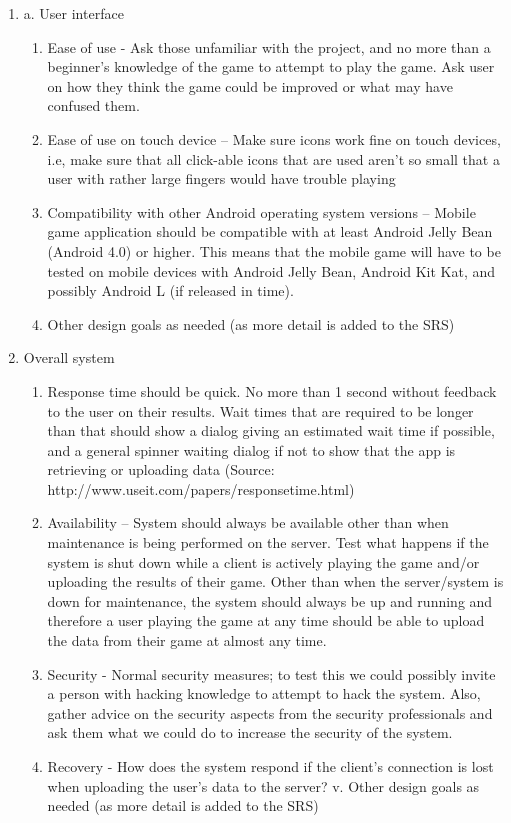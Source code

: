 \documentclass[a4wide]{article}
\begin{document}
\begin{enumerate}
\begin{enumerate}
\item a.	User interface
\begin{enumerate}
\item	Ease of use - Ask those unfamiliar with the project, and no more than a beginner’s knowledge of the game to attempt to play the game. Ask user on how they think the game could be improved or what may have confused them.
\item	Ease of use on touch device – Make sure icons work fine on touch devices, i.e, make sure that all click-able icons that are used aren't so small that a user with rather large fingers would have trouble playing
\item	Compatibility with other Android operating system versions – Mobile game application should be compatible with at least Android Jelly Bean (Android 4.0) or higher. This means that the mobile game will have to be tested on mobile devices with Android Jelly Bean, Android Kit Kat, and possibly Android L (if released in time).
\item 	Other design goals as needed (as more detail is added to the SRS)
\end{enumerate}
\item	Overall system
\begin{enumerate}
\item	 Response time should be quick. No more than 1 second without feedback to the user on their results. Wait times that are required to be longer than that should show a dialog giving an estimated wait time if possible, and a general spinner waiting dialog if not  to show that the app is retrieving or uploading data (Source: http://www.useit.com/papers/responsetime.html)
\item	Availability – System should always be available other than when maintenance is being performed on the server. Test what happens if the system is shut down while a client is actively playing the game and/or uploading the results of their game. Other than when the server/system is down for maintenance, the system should always be up and running and therefore a user playing the game at any time should be able to upload the data from their game at almost any time.
\item	Security - Normal security measures; to test this we could possibly invite a person with hacking knowledge to attempt to hack the system. Also, gather advice on the security aspects from the security professionals  and ask them what we could do to increase the security of the system.
\item	Recovery - How does the system respond if the client’s connection is lost when uploading the user’s data to the server?
v.	Other design goals as needed (as more detail is added to the SRS)
\end{enumerate}


\end{enumerate}
\end{enumerate}
\end{document}
